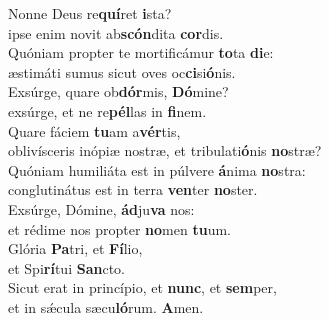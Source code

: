 \evenverse Nonne Deus re\textbf{quí}ret \textbf{i}sta?~\*\\
\evenverse ipse enim novit ab\textbf{scón}dita \textbf{cor}dis.\\
\oddverse Quóniam propter te mortificámur \textbf{to}ta \textbf{di}e:~\*\\
\oddverse æstimáti sumus sicut oves oc\textbf{ci}si\textbf{ó}nis.\\
\evenverse Exsúrge, quare ob\textbf{dór}mis, \textbf{Dó}mine?~\*\\
\evenverse exsúrge, et ne re\textbf{pél}las in \textbf{fi}nem.\\
\oddverse Quare fáciem \textbf{tu}am a\textbf{vér}tis,~\*\\
\oddverse oblivísceris inópiæ nostræ, et tribulati\textbf{ó}nis \textbf{no}stræ?\\
\evenverse Quóniam humiliáta est in púlvere \textbf{á}nima \textbf{no}stra:~\*\\
\evenverse conglutinátus est in terra \textbf{ven}ter \textbf{no}ster.\\
\oddverse Exsúrge, Dómine, \textbf{ád}ju\textbf{va} nos:~\*\\
\oddverse et rédime nos propter \textbf{no}men \textbf{tu}um.\\
\evenverse Glória \textbf{Pa}tri, et \textbf{Fí}lio,~\*\\
\evenverse et Spi\textbf{rí}tui \textbf{San}cto.\\
\oddverse Sicut erat in princípio, et \textbf{nunc}, et \textbf{sem}per,~\*\\
\oddverse et in sǽcula sæcu\textbf{ló}rum. \textbf{A}men.\\
